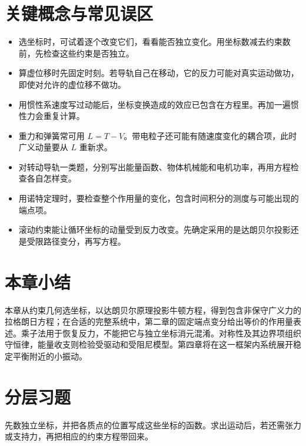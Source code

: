 \section*{关键概念与常见误区}
\begin{itemize}[leftmargin=1.8em]
\item 选坐标时，可试着逐个改变它们，看看能否独立变化。用坐标数减去约束数前，先检查这些约束是否独立。
\item 算虚位移时先固定时刻。若导轨自己在移动，它的反力可能对真实运动做功，即使对允许的虚位移不做功。
\item 用惯性系速度写过动能后，坐标变换造成的效应已包含在方程里。再加一遍惯性力会重复计算。
\item 重力和弹簧常可用 $L=T-V$。带电粒子还可能有随速度变化的耦合项，此时广义动量要从 $L$ 重新求。
\item 对转动导轨一类题，分别写出能量函数、物体机械能和电机功率，再用方程检查各自怎样变。
\item 用诺特定理时，要检查整个作用量的变化，包含时间积分的测度与可能出现的端点项。
\item 滚动约束能让循环坐标的动量受到反力改变。先确定采用的是达朗贝尔投影还是受限路径变分，再写方程。
\end{itemize}

\section*{本章小结}
本章从约束几何选坐标，以达朗贝尔原理投影牛顿方程，得到包含非保守广义力的拉格朗日方程；在合适的完整系统中，第二章的固定端点变分给出等价的作用量表述。乘子法用于恢复反力，不能把它与独立坐标消元混淆。对称性及其边界项组织守恒律，能量收支则检验受驱动和受阻尼模型。第四章将在这一框架内系统展开稳定平衡附近的小振动。

\section*{分层习题}
先数独立坐标，并把各质点的位置写成这些坐标的函数。求出运动后，若还需张力或支持力，再把相应的约束方程带回来。

